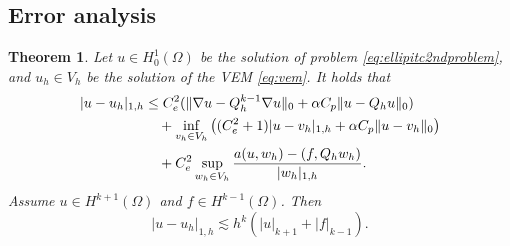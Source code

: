 \documentclass[10pt]{amsart}
\newtheorem{theorem}{Theorem}[section]
\numberwithin{equation}{section}
\begin{document}
\subsection{Error analysis}
\begin{theorem}\label{thm:errorestimateH1}
Let $u\in H_0^1(\Omega)$ be the solution of problem \eqref{eq:ellipitc2ndproblem}, and $u_h\in V_h$ be the solution of the VEM \eqref{eq:vem}. It holds that
\begin{align}
\label{eq:errorestimateH1abs}
|u-u_h|_{1,h}&\leq C_e^2(\|\nabla u-Q_h^{k-1}\nabla u\|_0+\alpha C_p\|u-Q_hu\|_0) \\
\notag
&\quad + \inf_{v_h\in V_h}\big((C_e^2+1)|u-v_h|_{1,h}+\alpha C_p\|u-v_h\|_0\big)\\
\notag
&\quad + C_e^2\sup_{w_h\in V_h}\frac{a(u,w_h)-(f, Q_hw_h)}{|w_h|_{1,h}}.
\end{align}
Assume $u\in H^{k+1}(\Omega)$ and $f\in H^{k-1}(\Omega)$. Then
\begin{equation}\label{eq:errorestimateH1}
|u-u_h|_{1,h}\lesssim h^k(|u|_{k+1}+|f|_{k-1}).
\end{equation}
\end{theorem}
\end{document}
